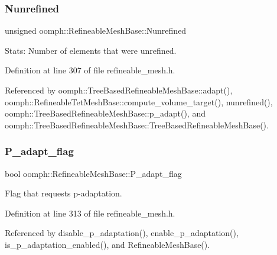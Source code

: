\subsubsection{\texorpdfstring{Nunrefined}{Nunrefined}}
{\footnotesize\ttfamily unsigned oomph\+::\+Refineable\+Mesh\+Base\+::\+Nunrefined\hspace{0.3cm}{\ttfamily [protected]}}



Stats\+: Number of elements that were unrefined. 



Definition at line 307 of file refineable\+\_\+mesh.\+h.



Referenced by oomph\+::\+Tree\+Based\+Refineable\+Mesh\+Base\+::adapt(), oomph\+::\+Refineable\+Tet\+Mesh\+Base\+::compute\+\_\+volume\+\_\+target(), nunrefined(), oomph\+::\+Tree\+Based\+Refineable\+Mesh\+Base\+::p\+\_\+adapt(), and oomph\+::\+Tree\+Based\+Refineable\+Mesh\+Base\+::\+Tree\+Based\+Refineable\+Mesh\+Base().

\mbox{\label{classoomph_1_1RefineableMeshBase_a0e378a1fe248b22b813bd31505f42de2}} 
\subsubsection{\texorpdfstring{P\+\_\+adapt\+\_\+flag}{P\_adapt\_flag}}
{\footnotesize\ttfamily bool oomph\+::\+Refineable\+Mesh\+Base\+::\+P\+\_\+adapt\+\_\+flag\hspace{0.3cm}{\ttfamily [protected]}}



Flag that requests p-\/adaptation. 



Definition at line 313 of file refineable\+\_\+mesh.\+h.



Referenced by disable\+\_\+p\+\_\+adaptation(), enable\+\_\+p\+\_\+adaptation(), is\+\_\+p\+\_\+adaptation\+\_\+enabled(), and Refineable\+Mesh\+Base().

\mbox{\label{classoomph_1_1RefineableMeshBase_a9e5f299e0f07b0b78d0147b207f94883}} 
